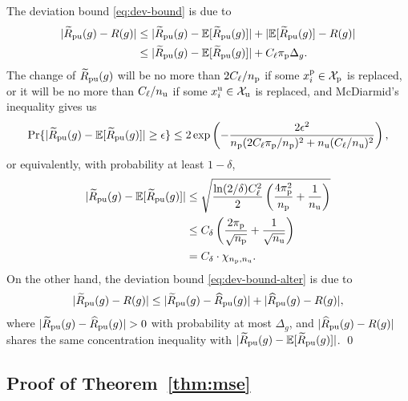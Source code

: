 The deviation bound \eqref{eq:dev-bound} is due to
\begin{align*}
|\tRpu(g)-R(g)|
&\le |\tRpu(g)-\bE[\tRpu(g)]|+|\bE[\tRpu(g)]-R(g)|\\
&\le |\tRpu(g)-\bE[\tRpu(g)]|+C_\ell\pip\Delta_g.
\end{align*}
The change of $\tRpu(g)$ will be no more than $2C_\ell/\Np$ if some $\xp_i\in\Xp$ is replaced, or it will be no more than $C_\ell/\Nu$ if some $\xu_i\in\Xu$ is replaced, and McDiarmid's inequality gives us
\begin{align*}
\pr\{|\tRpu(g)-\bE[\tRpu(g)]|\ge\epsilon\}
\le 2\exp\left(-\frac{2\epsilon^2}{\Np(2C_\ell\pip/\Np)^2+\Nu(C_\ell/\Nu)^2}\right),
\end{align*}
or equivalently, with probability at least $1-\delta$,
\begin{align*}
|\tRpu(g)-\bE[\tRpu(g)]|
&\le \sqrt{\frac{\ln(2/\delta)C_\ell^2}{2}\left(\frac{4\pip^2}{\Np}+\frac{1}{\Nu}\right)}\\
&\le C_\delta\left(\frac{2\pip}{\sqrt{\Np}}+\frac{1}{\sqrt{\Nu}}\right)\\
&= C_\delta\cdot\chi_{\Np,\Nu}.
\end{align*}
On the other hand, the deviation bound \eqref{eq:dev-bound-alter} is due to
\begin{align*}
|\tRpu(g)-R(g)| \le |\tRpu(g)-\hRpu(g)|+|\hRpu(g)-R(g)|,
\end{align*}
where $|\tRpu(g)-\hRpu(g)|>0$ with probability at most $\Delta_g$, and $|\hRpu(g)-R(g)|$ shares the same concentration inequality with $|\tRpu(g)-\bE[\tRpu(g)]|$. \qed

\subsection{Proof of Theorem~\ref{thm:mse}}

